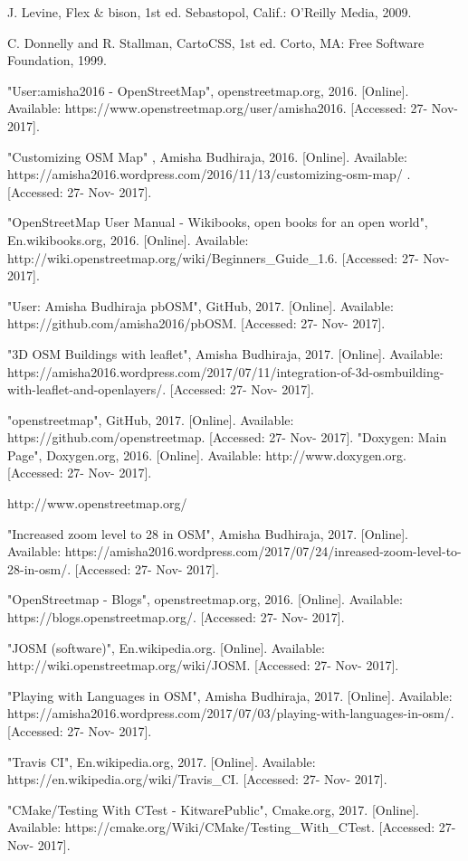  
\begin{thebibliography}{22}

\bibitem{} J. Levine, Flex \& bison, 1st ed. Sebastopol, Calif.: O'Reilly Media, 2009.

\bibitem{} C. Donnelly and R. Stallman, CartoCSS, 1st ed. Corto, MA: Free Software Foundation, 1999.

\bibitem{} "User:amisha2016 - OpenStreetMap", openstreetmap.org, 2016. [Online]. Available: https://www.openstreetmap.org/user/amisha2016. [Accessed: 27- Nov- 2017].

\bibitem{} "Customizing OSM Map" , Amisha Budhiraja, 2016. [Online]. Available: https://amisha2016.wordpress.com/2016/11/13/customizing-osm-map/ . [Accessed: 27- Nov- 2017].


\bibitem{} "OpenStreetMap User Manual - Wikibooks, open books for an open world", En.wikibooks.org, 2016. [Online]. Available: http://wiki.openstreetmap.org/wiki/Beginners\_Guide\_1.6. [Accessed: 27- Nov- 2017].

\bibitem{} "User: Amisha Budhiraja pbOSM", GitHub, 2017. [Online]. Available: https://github.com/amisha2016/pbOSM. [Accessed: 27- Nov- 2017].

\bibitem{} "3D OSM Buildings with leaflet", Amisha Budhiraja, 2017. [Online]. Available: https://amisha2016.wordpress.com/2017/07/11/integration-of-3d-osmbuilding-with-leaflet-and-openlayers/. [Accessed: 27- Nov- 2017].

\bibitem{} "openstreetmap", GitHub, 2017. [Online]. Available: https://github.com/openstreetmap. [Accessed: 27- Nov- 2017].
\bibitem{} "Doxygen: Main Page", Doxygen.org, 2016. [Online]. Available: http://www.doxygen.org. [Accessed: 27- Nov- 2017].

\bibitem{} http://www.openstreetmap.org/

\bibitem{} "Increased zoom level to 28 in OSM", Amisha Budhiraja, 2017. [Online]. Available: https://amisha2016.wordpress.com/2017/07/24/inreased-zoom-level-to-28-in-osm/. [Accessed: 27- Nov- 2017].


\bibitem{} "OpenStreetmap - Blogs", openstreetmap.org, 2016. [Online]. Available: https://blogs.openstreetmap.org/. [Accessed: 27- Nov- 2017].

\bibitem{} "JOSM (software)", En.wikipedia.org. [Online]. Available: http://wiki.openstreetmap.org/wiki/JOSM. [Accessed: 27- Nov- 2017].

\bibitem{} "Playing with Languages in OSM", Amisha Budhiraja, 2017. [Online]. Available: https://amisha2016.wordpress.com/2017/07/03/playing-with-languages-in-osm/. [Accessed: 27- Nov- 2017].	

\bibitem{}"Travis CI", En.wikipedia.org, 2017. [Online]. Available: https://en.wikipedia.org/wiki/Travis\_CI. [Accessed: 27- Nov- 2017].

\bibitem{} "CMake/Testing With CTest - KitwarePublic", Cmake.org, 2017. [Online]. Available: https://cmake.org/Wiki/CMake/Testing\_With\_CTest. [Accessed: 27- Nov- 2017].

\end{thebibliography}
